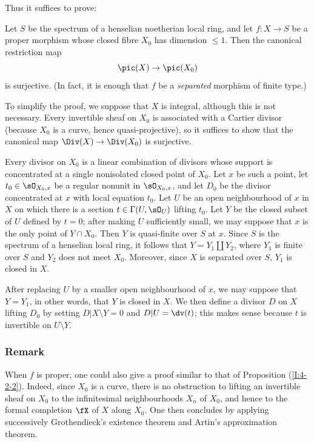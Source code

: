 \documentclass[oneside]{book}
\begin{document}
Thus it suffices to prove:

\begin{proposition}\label{I:4-4-1}
Let $S$ be the spectrum of a henselian noetherian local ring, and let
$f:X\to S$ be a proper morphism whose closed fibre $X_0$ has dimension
$\leqslant1$. Then the canonical restriction map
\[
  \pic(X)\to \pic(X_0)
\]
is surjective. (In fact, it is enough that $f$ be a \emph{separated}
morphism of finite type.)
\end{proposition}

To simplify the proof, we suppose that $X$ is integral, although this is
not necessary. Every invertible sheaf on $X_0$ is associated with a
Cartier divisor (because $X_0$ is a curve, hence quasi-projective), so it
suffices to show that the canonical map $\Div(X)\to\Div(X_0)$ is
surjective.

Every divisor on $X_0$ is a linear combination of divisors whose support
is concentrated at a single nonisolated closed point of $X_0$. Let $x$
be such a point, let $t_0\in\sO_{X_0,x}$ be a regular nonunit in
$\sO_{X_0,x}$, and let $D_0$ be the divisor concentrated at $x$ with
local equation $t_0$. Let $U$ be an open neighbourhood of $x$ in $X$
on which there is a section $t\in\Gamma(U,\sO_U)$ lifting $t_0$. Let
$Y$ be the closed subset of $U$ defined by $t=0$; after making $U$
sufficiently small, we may suppose that $x$ is the only point of
$Y\cap X_0$. Then $Y$ is quasi-finite over $S$ at $x$. Since $S$ is
the spectrum of a henselian local ring, it follows that
$Y=Y_1\amalg Y_2$, where $Y_1$ is finite over $S$ and $Y_2$ does not
meet $X_0$. Moreover, since $X$ is separated over $S$, $Y_1$ is closed
in $X$.

After replacing $U$ by a smaller open neighbourhood of $x$, we may
suppose that $Y=Y_1$, in other words, that $Y$ is closed in $X$. We then
define a divisor $D$ on $X$ lifting $D_0$ by setting
$D|X\setminus Y=0$ and $D|U=\dv(t)$; this makes sense because $t$ is
invertible on $U\setminus Y$.

\subsubsection{Remark}\label{I:4-4-2}

When $f$ is proper, one could also give a proof similar to that of
Proposition (\ref{I:4-2-2}). Indeed, since $X_0$ is a curve, there is no
obstruction to lifting an invertible sheaf on $X_0$ to the infinitesimal
neighbourhoods $X_n$ of $X_0$, and hence to the formal completion $\fX$
of $X$ along $X_0$. One then concludes by applying successively
Grothendieck's existence theorem and Artin's approximation theorem.
\end{document}

